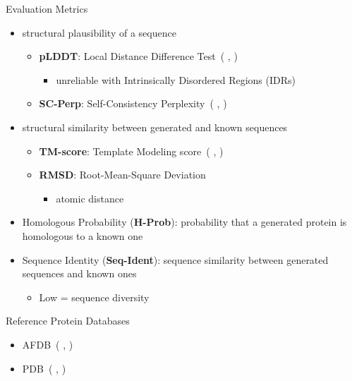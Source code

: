 \documentclass[dvipsnames,
hyperref={citecolor=blue}
]{beamer}
\renewcommand{\cite}[1]{({\color{blue} \citeauthor{#1}, \citeyear{#1}})}
\newcommand{\red}[1]{{\color{red} #1}}
\begin{document}
\begin{frame}{Evaluation Metrics}
	\begin{itemize}
		\item structural plausibility of a sequence
		\begin{itemize}
			\item \textbf{pLDDT}: Local Distance Difference Test~\cite{jumper2021highly}
			\begin{itemize}
				\item \red{unreliable with Intrinsically Disordered Regions (IDRs)}
			\end{itemize}
			\item \textbf{SC-Perp}: Self-Consistency Perplexity~\cite{alamdari2023protein}
		\end{itemize}
		\item structural similarity between generated and known sequences
		\begin{itemize}
			\item \textbf{TM-score}: Template Modeling score~\cite{zhang2004scoring}
			\item \textbf{RMSD}:  Root-Mean-Square Deviation
			\begin{itemize}
				\item atomic distance
			\end{itemize}
		\end{itemize}
		\item Homologous Probability (\textbf{H-Prob}): probability that a generated protein is homologous to a known one
		\item Sequence Identity (\textbf{Seq-Ident}): sequence similarity between generated sequences and known ones
		\begin{itemize}
			\item Low = sequence diversity
		\end{itemize}
	\end{itemize}
\end{frame}

\begin{frame}{Reference Protein Databases}
	\begin{itemize}
		\item AFDB~\cite{varadi2022alphafold}
		\item PDB~\cite{berman2002protein}
	\end{itemize}
\end{frame}
\end{document}
